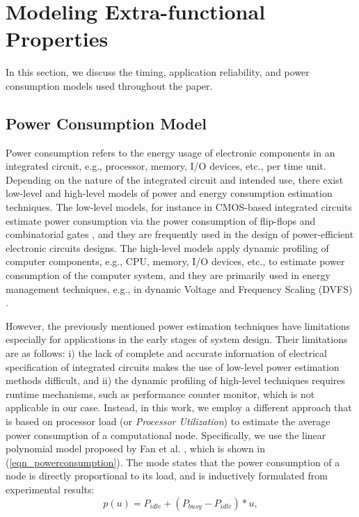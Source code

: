 \section{Modeling Extra-functional Properties}\label{sec_extrafunc}
In this section, we discuss the timing, application reliability, and power consumption models used throughout the paper.

\subsection{Power Consumption Model}
Power consumption refers to the energy usage of electronic components in an integrated circuit, e.g., processor, memory, I/O devices, etc., per time unit. Depending on the nature of the integrated circuit and intended use, there exist low-level and high-level models of power and energy consumption estimation techniques. The low-level models, for instance in CMOS-based integrated circuits estimate power consumption via the power consumption of flip-flops and combinatorial gates \cite{Najm1994ACircuits}\cite{Najm1995PowerCircuits}, and they are frequently used in the design of power-efficient electronic circuits designs. The high-level models apply dynamic profiling of computer components, e.g., CPU, memory, I/O devices, etc., to estimate power consumption of the computer system, and they are primarily used in energy management techniques, e.g., in dynamic Voltage and Frequency Scaling (DVFS) \cite{Contreras2005PowerEvents}.

However, the previously mentioned power estimation techniques have limitations especially for applications in the early stages of system design. Their limitations are as follows: i) the lack of complete and accurate information of electrical specification of integrated circuits makes the use of low-level power estimation methods difficult, and ii) the dynamic profiling of high-level techniques requires runtime mechanisms, such as performance counter monitor, which is not applicable in our case. Instead, in this work, we employ a different approach that is based on processor load (or \textit{Processor Utilization}) to estimate the average power consumption of a computational node. Specifically, we use the linear polynomial model proposed by Fan et al. \cite{Fan2007PowerComputer}, which is shown in (\ref{eqn_powerconsumption}). The mode states that the power consumption of a node is directly proportional to its load, and is inductively formulated from experimental results:
\begin{equation}
\label{eqn_powerconsumption}
p(u)=P_{idle} + (P_{busy}-P_{idle})*u,
\end{equation}

